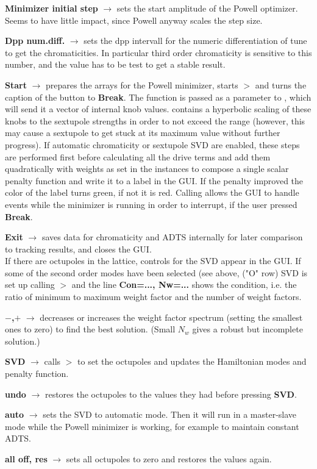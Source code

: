 \documentclass[12pt]{article}
\newcommand\code[1]{{\tt #1}}
\newcommand{\ofld}[1]{\colorbox{black!15}{{{\color{black}\bf #1}}}}
\newcommand{\ofldx}[1]{\colorbox{black!15}{{\color{black}(#1)}}}
\newcommand\guico[1]{{\color{blue}\code{#1}}}
\newcommand{\unico}[1]{{\color{burntorange}\code{#1}}}
\newcommand{\evcod}[2]{\ofld{#1} $\rightarrow$ \guico{#2}}
\newcommand{\prcod}[2]{\opauni{#1}$>$\unico{#2}}
\newcommand{\opaguif}[1]{\colorbox{violet!30}{{\color{black}\code{#1}}}}
\newcommand{\oguif}[1]{\hyperref[#1]{\opaguif{#1}}}
\newcommand{\opauni}[1]{\colorbox{orange!30}{{\color{black}\code{#1}}}}
\newcommand{\todo}[1]{{\color{red} #1}}
\begin{document}
{\evcod{Minimizer initial step}{EdMinAmp(KeyPress,Exit)} sets the start amplitude of the Powell optimizer. \todo{Seems to have little impact, since Powell anyway scales the step size.}

\evcod{Dpp num.diff.}{EdNumDiff(KeyPress,Exit)} sets the dpp intervall for the numeric differentiation of tune to get the chromaticities. In particular third order chromaticity is sensitive to this number, and the value has to be test to get a stable result.

\evcod{Start}{ButMinClick} prepares the arrays for the Powell minimizer, starts \prcod{mathlib}{Powell} and turns the caption of the button to \ofld{Break}. The function \guico{PenaltyFunction} is passed as a parameter to \unico{Powell}, which will send it a vector of internal knob values. \guico{PenaltyFunction} contains a hyperbolic scaling of these knobs to the sextupole strengths in order to not exceed the range (however, this may cause a sextupole to get stuck at its maximum value without further progress). If automatic chromaticity or sextupole SVD are enabled, these steps are performed first before calculating all the drive terms and add them quadratically with weights as set in the \oguif{chamframe} instances to compose a single scalar penalty function and write it to a label in the GUI. If the penalty improved the color of the label turns green, if not it is red. Calling \unico{Application.ProcessMessages} allows the GUI to handle events while the minimizer is running in order to interrupt, if the user pressed \ofld{Break}. 

\evcod{Exit}{ButExClick} saves data for chromaticity and ADTS internally for later comparison to tracking results, and closes the GUI.\\

If there are octupoles in the lattice, controls for the SVD appear in the GUI. If some of the second order modes have been selected (see above, \ofldx{"O" row} SVD is set up calling \prcod{chromlib}{Oct\_SVDCMP} and the line \ofld{Con=..., Nw=...} shows the condition, i.e. the ratio of minimum to maximum weight factor and the number of weight factors.

\evcod{$-$,$+$}{ButOsvdN(m,p)Click} decreases or increases the weight factor spectrum (setting the smallest ones to zero) to find the best solution. (Small $N_w$ gives a robust but incomplete solution.)

\evcod{SVD}{ButOsvdDoClick} calls \prcod{chromlib}{Oct\_SVBKSB} to set the octupoles and updates the Hamiltonian modes and penalty function.

\evcod{undo}{ButOsvdUndoClick} restores the octupoles to the values they had before pressing \ofld{SVD}.

\evcod{auto}{chkOsvdAutoClick} sets the SVD to automatic mode. Then it will run in a master-slave mode while the Powell minimizer is working, for example to maintain constant ADTS.

\evcod{all off, res}{ButOct(Off, Res)Click} sets all octupoles to zero and restores the values again.
}
\end{document}
